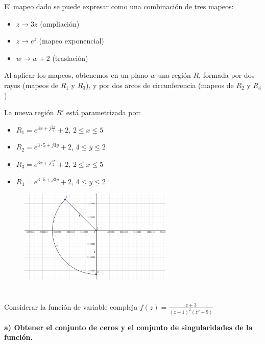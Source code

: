 \documentclass[12pt,a4paper]{report}
\begin{document}
El mapeo dado se puede expresar como una combinación de tres mapeos:

\begin{itemize}
    \item $z \rightarrow 3z$ (ampliación)
    \item $z \rightarrow e^z$ (mapeo exponencial)
    \item $w \rightarrow w + 2$ (traslación)
\end{itemize}

Al aplicar los mapeos, obtenemos en un plano $w$ una región $R$, formada por dos rayos (mapeos de $R_1$ y $R_3$), y por dos arcos de circunferencia (mapeos de $R_2$ y $R_4$).

La nueva región $R'$ está parametrizada por:
\begin{itemize}
    \item $R_1 = e^{3x+j\frac{3\pi}{4}} + 2$, $2 \leq x \leq 5$
    \item $R_2 = e^{3 \cdot 5+j3y} + 2$, $4 \leq y \leq 2$
    \item $R_3 = e^{3x+j\frac{3\pi}{2}} + 2$, $2 \leq x \leq 5$
    \item $R_4 = e^{3 \cdot 5+j3y} + 2$, $4 \leq y \leq 2$
\end{itemize}


\begin{figure}[h] %
    \centering %
    \includegraphics[width=0.65\textwidth]{./Imagenes/foto2Ej4.png} %
\end{figure}

\chapter{}%

Considerar la función de variable compleja $f(z) =\frac{z + 3}{(z - 1)^2(z^2 + 9)}$

\textbf{a) Obtener el conjunto de ceros y el conjunto de singularidades de la función.}
\end{document}
